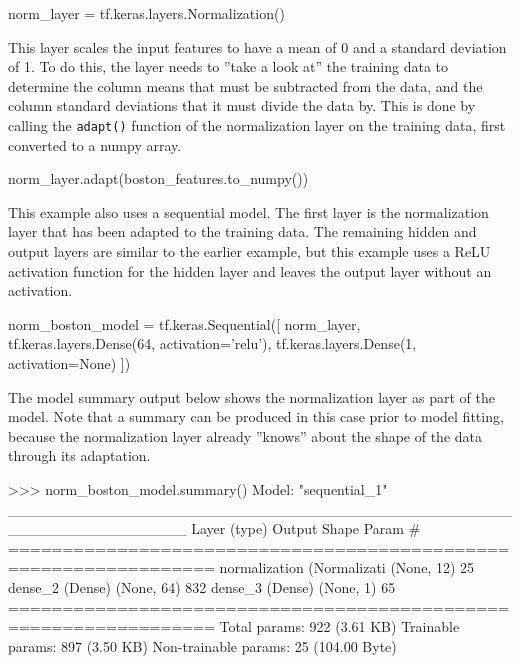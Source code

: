 \begin{pythoncode}
norm_layer = tf.keras.layers.Normalization()
\end{pythoncode}

This layer scales the input features to have a mean of 0 and a standard deviation of 1. To do this, the layer needs to ''take a look at'' the training data to determine the column means that must be subtracted from the data, and the column standard deviations that it must divide the data by. This is done by calling the \texttt{adapt()} function of the normalization layer on the training data, first converted to a numpy array.

\begin{pythoncode}
norm_layer.adapt(boston_features.to_numpy())
\end{pythoncode}

This example also uses a sequential model. The first layer is the normalization layer that has been adapted to the training data. The remaining hidden and output layers are similar to the earlier example, but this example uses a ReLU activation function for the hidden layer and leaves the output layer without an activation.

\begin{samepage}
\begin{pythoncode}
norm_boston_model = tf.keras.Sequential([
  norm_layer,
  tf.keras.layers.Dense(64, activation='relu'),
  tf.keras.layers.Dense(1, activation=None)
])
\end{pythoncode}
\end{samepage}

The model summary output below shows the normalization layer as part of the model. Note that a summary can be produced in this case prior to model fitting, because the normalization layer already ''knows'' about the shape of the data through its adaptation. 

\begin{samepage}
\begin{textcode}
>>> norm_boston_model.summary()
Model: "sequential_1"
_________________________________________________________________
 Layer (type)                Output Shape              Param #   
=================================================================
 normalization (Normalizati  (None, 12)                25        
 dense_2 (Dense)             (None, 64)                832       
 dense_3 (Dense)             (None, 1)                 65        
=================================================================
Total params: 922 (3.61 KB)
Trainable params: 897 (3.50 KB)
Non-trainable params: 25 (104.00 Byte)
\end{textcode}
\end{samepage}


